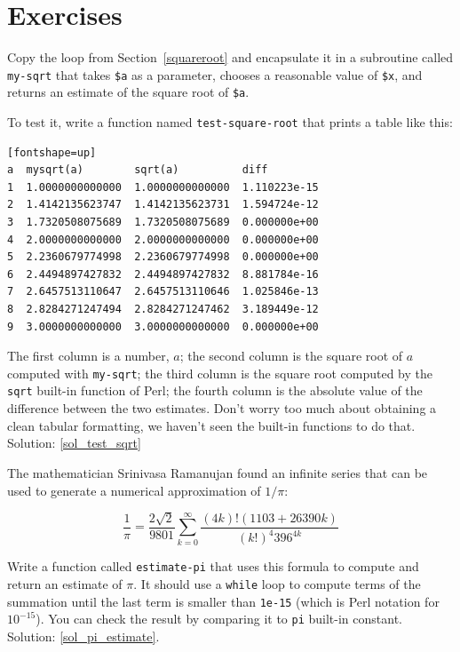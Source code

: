 \section{Exercises}

\begin{exercise}
\label{test_sqrt}

Copy the loop from Section~\ref{squareroot}
and encapsulate it in a subroutine called
\verb"my-sqrt" that takes {\tt \$a} as a parameter, chooses a
reasonable value of {\tt \$x}, and returns an estimate of 
the square root of {\tt \$a}.

To test it, write a function named \verb"test-square-root"
that prints a table like this:

\begin{verbatim}[fontshape=up]
a  mysqrt(a)        sqrt(a)          diff
1  1.0000000000000  1.0000000000000  1.110223e-15
2  1.4142135623747  1.4142135623731  1.594724e-12
3  1.7320508075689  1.7320508075689  0.000000e+00
4  2.0000000000000  2.0000000000000  0.000000e+00
5  2.2360679774998  2.2360679774998  0.000000e+00
6  2.4494897427832  2.4494897427832  8.881784e-16
7  2.6457513110647  2.6457513110646  1.025846e-13
8  2.8284271247494  2.8284271247462  3.189449e-12
9  3.0000000000000  3.0000000000000  0.000000e+00

\end{verbatim}
%
The first column is a number, $a$; the second column is the 
square root of $a$ computed with \verb"my-sqrt"; the third 
column is the square root computed by the {\tt sqrt} built-in 
function of Perl; the fourth column is the absolute value of 
the difference between the two estimates. Don't worry too much about 
obtaining a clean tabular formatting, we haven't 
seen the built-in functions to do that. Solution: \ref{sol_test_sqrt}
%

\end{exercise}



\begin{exercise}
\label{pi_estimate}

The mathematician Srinivasa Ramanujan found an
infinite series
that can be used to generate a numerical
approximation of $1 / \pi$:

\[ \frac{1}{\pi} = \frac{2\sqrt{2}}{9801} 
\sum^\infty_{k=0} \frac{(4k)!(1103+26390k)}{(k!)^4 396^{4k}} \]

Write a function called \verb"estimate-pi" that uses this 
formula to compute and return an estimate of $\pi$.  It 
should use a {\tt while} loop to compute terms of the 
summation until the last term is smaller than {\tt 1e-15} 
(which is Perl notation for $10^{-15}$). You can check
the result by comparing it to {\tt pi} built-in constant.
Solution: \ref{sol_pi_estimate}.

\end{exercise}

